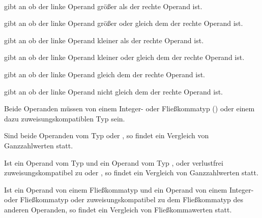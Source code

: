 \hspace*{1cm}\glq\Gt{>=}\grq  {} \\
\hspace*{1cm}\glq\Gt{>=}\grq  {}  \\
\hspace*{1cm}\glq\Gt{<}\grq  {} \\
\hspace*{1cm}\glq\Gt{<}\grq  {}  \\
\hspace*{1cm}\glq\Gt{<=}\grq  {} \\
\hspace*{1cm}\glq\Gt{<=}\grq  {}  \\

\op{>} gibt an ob der linke Operand größer als der rechte Operand ist.

\op{>=} gibt an ob der linke Operand größer oder gleich dem der rechte Operand ist.

\op{<} gibt an ob der linke Operand kleiner als der rechte Operand ist.

\op{<=} gibt an ob der linke Operand kleiner oder gleich dem der rechte Operand ist.

\op{==} gibt an ob der linke Operand gleich dem der rechte Operand ist.

\op{!=} gibt an ob der linke Operand nicht gleich dem der rechte Operand ist.

Beide Operanden müssen von einem Integer- oder Fließkommatyp () oder einem
dazu zuweisungskompatiblen Typ sein.

Sind beide Operanden vom Typ  oder , so findet ein Vergleich von Ganzzahlwerten statt.

Ist ein Operand vom Typ  und ein Operand vom Typ ,  oder
verlustfrei zuweisungskompatibel zu  oder , so findet ein Vergleich von Ganzzahlwerten statt.

Ist ein Operand von einem Fließkommatyp und ein Operand von einem Integer- oder Fließkommatyp
oder zuweisungskompatibel zu dem Fließkommatyp des anderen Operanden,
so findet ein Vergleich von Fließkommawerten statt.


